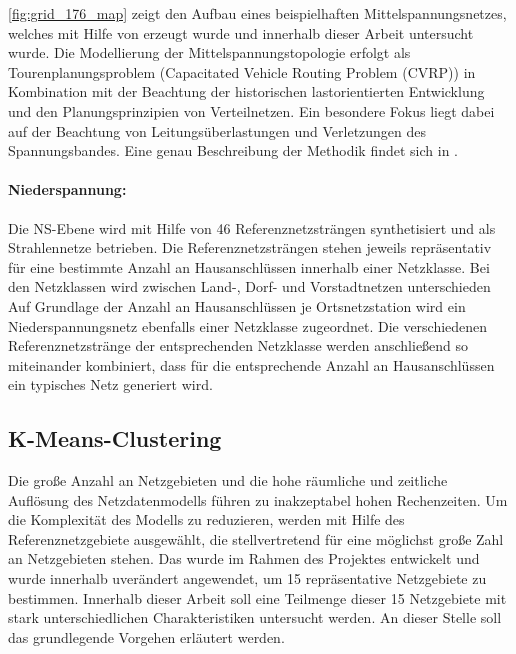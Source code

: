 

\autoref{fig:grid_176_map} zeigt den Aufbau eines beispielhaften Mittelspannungsnetzes, welches mit Hilfe von \dingo erzeugt wurde und innerhalb dieser Arbeit untersucht wurde.
Die Modellierung der Mittelspannungstopologie erfolgt als Tourenplanungsproblem (Capacitated Vehicle Routing
Problem (CVRP)) in Kombination mit der Beachtung der historischen lastorientierten Entwicklung und den Planungsprinzipien von Verteilnetzen.
Ein besondere Fokus liegt dabei auf der Beachtung von Leitungsüberlastungen und Verletzungen des Spannungsbandes.
Eine genau Beschreibung der Methodik findet sich in \cite{Amme2018}.


\paragraph{Niederspannung:}

Die \gls{NS}-Ebene wird mit Hilfe von \num{46} Referenznetzsträngen synthetisiert und als Strahlennetze betrieben.
Die Referenznetzsträngen stehen jeweils repräsentativ für eine bestimmte Anzahl an Hausanschlüssen innerhalb einer Netzklasse.
Bei den Netzklassen wird zwischen Land-, Dorf- und Vorstadtnetzen unterschieden
Auf Grundlage der Anzahl an Hausanschlüssen je Ortsnetzstation wird ein Niederspannungsnetz ebenfalls einer Netzklasse zugeordnet.
Die verschiedenen Referenznetzstränge der entsprechenden Netzklasse werden anschließend so miteinander kombiniert, dass für die entsprechende Anzahl an Hausanschlüssen ein typisches Netz generiert wird. \cite{Mueller2019}


\subsection{K-Means-Clustering}

Die große Anzahl an Netzgebieten und die hohe räumliche und zeitliche Auflösung des Netzdatenmodells führen zu inakzeptabel hohen Rechenzeiten.
Um die Komplexität des Modells zu reduzieren, werden mit Hilfe des \kmeans Referenznetzgebiete ausgewählt, die stellvertretend für eine möglichst große Zahl an Netzgebieten stehen.
Das \kmean wurde im Rahmen des \openego Projektes \cite{Mueller2019} entwickelt und wurde innerhalb \cite{Schachler} uverändert angewendet, um \num{15} repräsentative Netzgebiete zu bestimmen.
Innerhalb dieser Arbeit soll eine Teilmenge dieser \num{15} Netzgebiete mit stark unterschiedlichen Charakteristiken untersucht werden.
An dieser Stelle soll das grundlegende Vorgehen erläutert werden. \medskip

